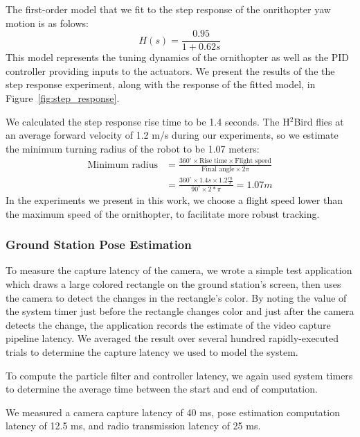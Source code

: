 \documentclass{aamas2013}
\begin{document}
The first-order model that we fit to the step response of the onrithopter 
yaw motion is as folows:
\begin{equation}
\label{eq:transfer_func}
H(s) = \frac{0.95}{1+0.62s}
\end{equation}
This model represents the tuning dynamics of the ornithopter as well as the
PID controller providing inputs to the actuators. We present the results of
the the step response experiment, along with the response of the fitted model,
in Figure~\ref{fig:step_response}.

We calculated the step response rise time to be 1.4 seconds. The H$^2$Bird flies at an 
average forward velocity of 1.2 m/s during our experiments, so we estimate 
the minimum turning radius of the robot to be 1.07 meters:
\begin{equation}
\label{eq:min_radius}
\begin{aligned}
\text{Minimum radius} & = \frac{360^{\circ}\times\text{Rise time}\times\text{Flight
speed}}{\text{Final angle}\times 2\pi}\\
& = \frac{360^{\circ}\times 1.4s\times 1.2\frac{m}{s}}{90^{\circ}\times2*\pi} = 1.07 m
\end{aligned}
\end{equation}
In the experiments we present in this work, we choose a flight speed lower 
than the maximum speed of the ornithopter, to facilitate more robust 
tracking.

\subsubsection{Ground Station Pose Estimation}
To measure the capture latency of the camera, we wrote a simple test
application which draws a large colored rectangle on the ground station's
screen, then uses the camera to detect the changes in the rectangle's color.
By noting the value of the system timer just before the rectangle changes
color and just after the camera detects the change, the application records
the estimate of the video capture pipeline latency. We averaged the result
over several hundred rapidly-executed trials to determine the capture latency
we used to model the system.

To compute the particle filter and controller latency, we again used system 
timers to determine the average time between the start and end of computation.

We measured a camera capture latency of 40 ms, pose estimation computation 
latency of 12.5 ms, and radio transmission latency of 25 ms.
\end{document}
